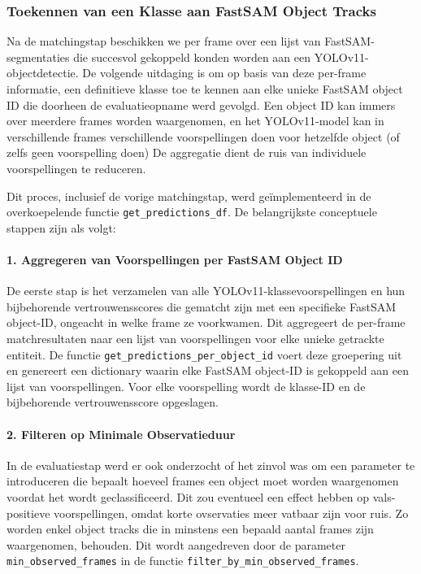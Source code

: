 \subsubsection{Toekennen van een Klasse aan FastSAM Object Tracks}

Na de matchingstap beschikken we per frame over een lijst van FastSAM-segmentaties die 
succesvol gekoppeld konden worden aan een YOLOv11-objectdetectie.
De volgende uitdaging is om op basis van deze per-frame informatie, een definitieve klasse toe te kennen aan elke unieke FastSAM object ID
die doorheen de evaluatieopname werd gevolgd.
Een object ID kan immers over meerdere frames worden waargenomen, 
en het YOLOv11-model kan in verschillende frames verschillende voorspellingen doen voor hetzelfde object (of zelfs geen voorspelling doen)
De aggregatie dient de ruis van individuele voorspellingen te reduceren.

Dit proces, inclusief de vorige matchingstap, werd geïmplementeerd in de overkoepelende functie \texttt{get\_predictions\_df}.
De belangrijkste conceptuele stappen zijn als volgt:

\paragraph{1. Aggregeren van Voorspellingen per FastSAM Object ID}
De eerste stap is het verzamelen van alle YOLOv11-klassevoorspellingen en hun bijbehorende 
vertrouwensscores die gematcht zijn met een specifieke FastSAM object-ID, 
ongeacht in welke frame ze voorkwamen. 
Dit aggregeert de per-frame matchresultaten naar een lijst van voorspellingen voor elke unieke getrackte entiteit. 
De functie \texttt{get\_predictions\_per\_object\_id} voert deze groepering uit en genereert een dictionary waarin elke FastSAM object-ID is gekoppeld aan een lijst van voorspellingen.
Voor elke voorspelling wordt de klasse-ID en de bijbehorende vertrouwensscore opgeslagen.

\paragraph{2. Filteren op Minimale Observatieduur}
In de evaluatiestap werd er ook onderzocht of het zinvol was om een parameter te introduceren die bepaalt hoeveel frames een object moet worden waargenomen
voordat het wordt geclassificeerd. Dit zou eventueel een effect hebben op vals-positieve voorspellingen, omdat korte ovservaties meer vatbaar zijn voor ruis.
Zo worden enkel object tracks die in minstens een bepaald aantal frames zijn waargenomen, behouden.
Dit wordt aangedreven door de parameter \texttt{min\_observed\_frames} in de functie \texttt{filter\_by\_min\_observed\_frames}.

